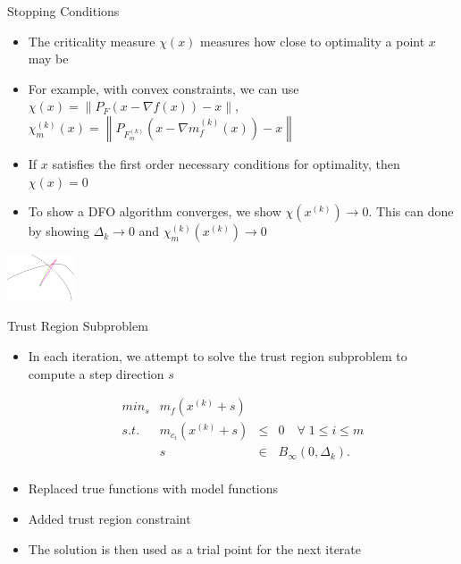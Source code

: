 \documentclass{beamer}
\newcommand{\xk}{{{x}^{(k)}}}
\newcommand{\dk}{{\Delta_k}}
\newcommand{\mk}{{m_f}}
\newcommand{\mck}{{m_{c_i}}}
\begin{document}
\begin{frame}{Stopping Conditions}
	\begin{itemize}
		\item The criticality measure $\chi\left(x\right)$ measures how close to optimality a point $x$ may be
		\item For example, with convex constraints, we can use 
		$\chi(x) = \left\|P_{F}\left(x - \nabla f \left(x\right)\right) - x \right\|$, \\
		$\chi^{(k)}_m(x) = \left\|P_{F^{(k)}_m}\left(x - \nabla m^{(k)}_f \left(x\right)\right) - x \right\|$ \\
		\item If $x$ satisfies the first order necessary conditions for optimality, then $\chi(x) = 0$
		\item To show a DFO algorithm converges, we show $\chi\left(\xk\right) \to 0$.
		This can done by showing $\dk \to 0$ and $\chi^{(k)}_m\left(\xk\right) \to 0$
	\end{itemize}
	\begin{center}
		\includegraphics[width=75px]{images/criticality.png}
	\end{center}
\end{frame}

\begin{frame}{Trust Region Subproblem}
	\begin{itemize}
		\item In each iteration, we attempt to solve the trust region subproblem to compute a step direction $s$

		\begin{displaymath}
\begin{array}{lrcc}
min_s & \mk(\xk + s)   &	 &			\\
s.t.  &  \mck(\xk + s) & \le & 0   \quad \forall \; 1 \le i \le m	   \\
	  &  s & \in & B_{\infty}(0, \dk).  \\
\end{array}
		\end{displaymath}
		\item Replaced true functions with model functions
		\item Added trust region constraint
		\item The solution is then used as a trial point for the next iterate
	\end{itemize}
\end{frame}
\end{document}
